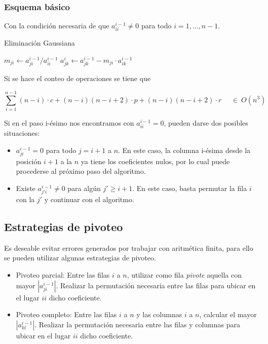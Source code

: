 \newpage

\subsubsection{Esquema básico}\label{subsubsec:eg_esquema_basico}

Con la condición necesaria de que $a_{ii}^{i-1} \neq 0$ para todo $i = 1,\ldots,n-1$.

\begin{algorithm}
\begin{algorithmic}
\caption{Eliminación Gaussiana}\label{alg:eg}

        \State $m_{ji} \gets a_{ji}^{i-1}/a_{ii}^{i-1}$ 
            \State $a_{jk}^{i} \gets a_{jk}^{i-1} - m_{ji}\cdot a_{ik}^{i-1}$ 
        \EndFor    
    \EndFor
\EndFor
\end{algorithmic}
\end{algorithm}

Si se hace el conteo de operaciones se tiene que

\[
\sum_{i=1}^{n-1} (n-i)\cdot c + (n-i)(n-i+2)\cdot p + (n-i)(n-i + 2)\cdot r ~~~~~~\in~ O(n^3)
\]

Si en el paso i-ésimo nos encontramos con $a_{ii}^{i-1} = 0$, pueden darse dos posibles situaciones:
\begin{itemize}
    \item $a_{ji}^{i-1} = 0$ para todo $j = i+1$ a $n$. En este caso, la columna i-ésima desde la posición $i+1$ a la $n$ ya tiene los coeficientes nulos, por lo cual puede procederse al próximo paso del algoritmo.
    \item Existe $a_{j'i}^{i-1} \neq 0$ para algún $j' \geq i+1$. En este caso, basta permutar la fila $i$ con la $j'$ y continuar con el algoritmo.
\end{itemize}

\subsection{Estrategias de pivoteo}\label{subsec:estrategias_de_pivoteo}

Es deseable evitar errores generados por trabajar con aritmética finita, para ello se pueden utilizar algunas estrategias de pivoteo.

\begin{itemize}
    \item Pivoteo parcial: Entre las filas $i$ a $n$, utilizar como fila \emph{pivote} aquella con mayor $|a_{ji}^{i-1}|$. Realizar la permutación necesaria entre las filas para ubicar en el lugar $ii$ dicho coeficiente.
    \item Pivoteo completo: Entre las filas $i$ a $n$ y las columnas $i$ a $n$, calcular el mayor $|a_{kl}^{i-1}|$. Realizar la permutación necesaria entre las filas y columnas para ubicar en el lugar $ii$ dicho coeficiente.
\end{itemize}
